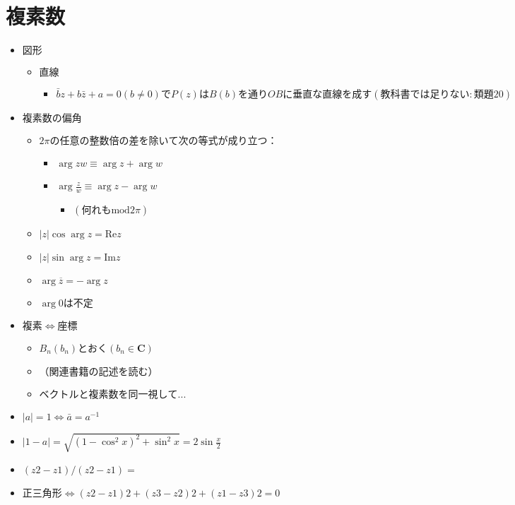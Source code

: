 \documentclass[dvipdfmx,uplatex]{jsarticle}
\begin{document}
\section{複素数}
\begin{itemize}
	\item $ 図形$
	\begin{itemize}
		\item $ 直線$
		\begin{itemize}
			\item $ \bar{b} z + b \bar{z}+ a = 0 (b \neq 0) でP(z)はB(b)を通りOBに垂直な直線を成す(教科書では足りない:類題20)$
		\end{itemize}
	\end{itemize}
	\item $ 複素数の偏角$
		\begin{itemize}
			\item $ 2 \pi の任意の整数倍の差を除いて次の等式が成り立つ：$
			\begin{itemize}
				\item $ \arg zw \equiv \arg z + \arg w$
				\item $ \arg \frac{z}{w} \equiv \arg z − \arg w$
				\begin{itemize}
					\item $ (何れも \mathrm{mod} 2 \pi)$
				\end{itemize}
			\end{itemize}
		\item $ |z| \cos \arg z = \mathrm{Re} z$
		\item $ |z| \sin \arg z = \mathrm{Im} z$
		\item $ \arg \overline{z} = - \arg z$
		\item $ \arg 0 は不定$
	\end{itemize}
	\item $ 複素 \Leftrightarrow 座標$
	\begin{itemize}
		\item $ B_n(b_n)とおく (b_n \in \bm{C})$
		\item $ （関連書籍の記述を読む）$
		\item $ ベクトルと複素数を同一視して...$
	\end{itemize}
	\item $ |a| = 1 \Leftrightarrow \bar{a} = a^{-1} $
	\item $ |1 - a| = \sqrt{(1 - \cos^2 x)^2 + \sin^2 x} = 2 \sin \frac{x}{2}$
	\item $ (z2-z1)/(z2-z1) =$
	\item $ 正三角形\Leftrightarrow(z2-z1)2+(z3-z2)2+(z1-z3)2=0$

\end{itemize}
\end{document}
